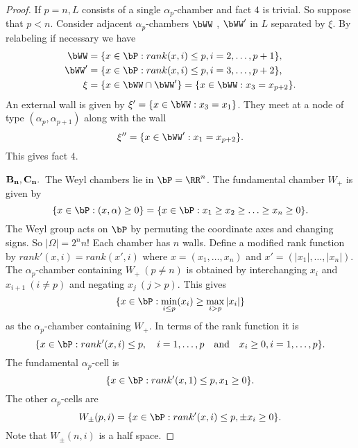 \documentclass{memo-l}
\theoremstyle{definition}
\theoremstyle{remark}
\numberwithin{section}{chapter}
\numberwithin{equation}{chapter}
\begin{document}
\begin{proof}
   If $p = n, L$ consists of a single ${\alpha}_{p}$-chamber and fact $4$ is
trivial.  So suppose that $p<n$.  Consider adjacent ${\alpha}_{p}$-chambers
$\bWW$ , $\bWW'$ in $L$ separated by ${\xi}$.  By relabeling if
necessary we have
$$
\aligned
\bWW &= \{x  \in  \bP: rank(x,i) \le p, i = 2,\ldots ,p+1\},\\
\bWW' &= \{x  \in  \bP: rank(x,i) \le p, i = 3,\ldots ,p+2\},\\
{\xi} &= \{x  \in \bWW  \cap  \bWW'\} = \{x  \in
\bWW: x_{3} = x_{p+2}\}.
\endaligned
$$
An external wall is given by ${\xi}' = \{x  \in  \bWW: x_{3} = x_{1}\}$.
 They meet at a node of type
$({\alpha}_{p},{\alpha}_{p+1})$ along with the wall
$$
{\xi}'' = \{ x  \in  \bWW': x_{1} = x_{p+2}\}.
$$
This gives fact $4$.

\medpagebreak

\noindent
$\bold{B_n,C_n.}$\  The Weyl chambers lie in $\bP = {\RR}^{n}$.
The fundamental chamber $W_{+}$ is given by
$$
\{ x \in \bP: (x,{\alpha}) \ge 0\} = \{ x \in \bP: x_{1} \ge
x_{2} \ge \ldots \ge x_{n} \ge 0\}.
$$
The Weyl group acts on $\bP$ by permuting the coordinate axes and
changing signs.  So $\vert {\Omega}\vert =2^{n}n$!  Each chamber has $n$
walls.  Define a modified rank function by $rank'(x,i) = rank(x',i)$ where
$x = (x_{1},\ldots ,x_{n})$ and $x' = (\vert x_{1}\vert ,\ldots ,\vert
x_{n}\vert )$.  The ${\alpha}_{p}$-chamber containing $W_{+}\ (p \ne n)$ is
obtained by interchanging $x_{i}$ and $x_{i+1}\ (i\ne p)$ and negating
$x_{j}\ (j > p)$.  This gives
$$
\{x  \in  \bP: \min_{i \le  p} (x_{i}) \ge \max_{i > p} \vert
x_{i}\vert \}
$$
as the ${\alpha}_{p}$-chamber containing $W_{+}$.  In terms of the rank
function it is
$$
\{x \in \bP: rank'(x,i) \le p,\quad i = 1,\ldots ,p\quad {\text{and}}\quad
x_{i} \ge 0, i = 1,\ldots ,p\}.
$$
The fundamental ${\alpha}_{p}$-cell is
$$
\{x  \in  \bP: rank'(x,1) \le p, x_{1} \ge 0\}.
$$
The other ${\alpha}_{p}$-cells are
$$
W_{{\pm}}(p,i) = \{x  \in  \bP: rank'(x,i) \le p, {\pm}x_{i} \ge 0\}.
$$
Note that $W_{{\pm}}(n,i)$ is a half space.


\end{proof}
\end{document}
